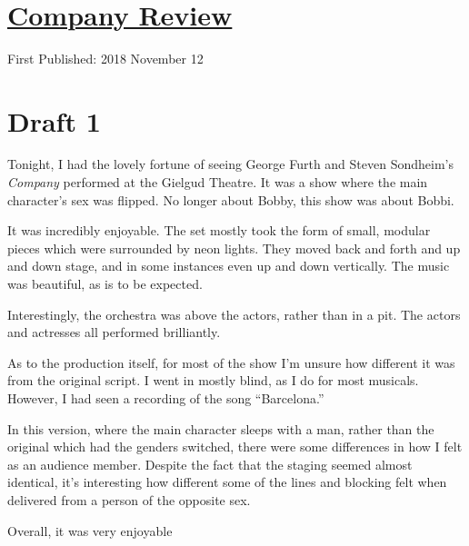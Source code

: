 \documentclass[12pt]{article}[titlepage]
\newcommand{\say}[1]{``#1''}
\newcommand{\1}{\={a}}
\newcommand{\2}{\={e}}
\newcommand{\3}{\={\i}}
\newcommand{\4}{\=o}
\newcommand{\5}{\=u}
\newcommand{\6}{\={A}}
\renewcommand{\,}{\textsuperscript{,}}
\begin{document}

\doublespacing
\section{\href{company.html}{Company Review}}
First Published: 2018 November 12

\section{Draft 1}
Tonight, I had the lovely fortune of seeing George Furth and Steven Sondheim's \textit{Company} performed at the Gielgud Theatre.
It was a show where the main character's sex was flipped.
No longer about Bobby, this show was about Bobbi.

It was incredibly enjoyable.
The set mostly took the form of small, modular pieces which were surrounded by neon lights.
They moved back and forth and up and down stage, and in some instances even up and down vertically.
The music was beautiful, as is to be expected.

Interestingly, the orchestra was above the actors, rather than in a pit.
The actors and actresses all performed brilliantly.

As to the production itself, for most of the show I'm unsure how different it was from the original script.
I went in mostly blind, as I do for most musicals.
However, I had seen a recording of the song \say{Barcelona.}

In this version, where the main character sleeps with a man, rather than the original which had the genders switched, there were some differences in how I felt as an audience member.
Despite the fact that the staging seemed almost identical, it's interesting how different some of the lines and blocking felt when delivered from a person of the opposite sex.

Overall, it was very enjoyable
\end{document}

